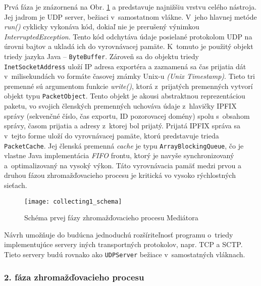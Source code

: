 Prvá fáza je znázornená na Obr. \ref{o:collecting1_schema} a predstavuje najnižšiu vrstvu celého 
nástroja. Jej jadrom je UDP server, bežiaci v~samostatnom vlákne. V~jeho hlavnej metóde \emph{run()}
cyklicky vykonáva kód, dokiaľ nie je prerušený výnimkou \emph{InterruptedException}.
Tento kód odchytáva údaje posielané protokolom UDP na úrovni bajtov a ukladá ich do 
vyrovnávacej pamäte. K~tomuto je použitý objekt triedy jazyka Java -- \verb|ByteBuffer|. Zároveň sa do 
objektu triedy \verb|InetSocketAddress| uloží IP adresa exportéra a zaznamená sa čas prijatia dát
v~milisekundách vo formáte časovej známky Unix-u \emph{(Unix Timestamp)}. Tieto tri premenné sú argumentom 
funkcie \emph{write()}, 
ktorá z~prijatých premenných vytvorí objekt typu \verb|PacketObject|. Tento objekt je akousi
abstraktnou reprezentáciou paketu, vo svojich členských premenných uchováva údaje z~hlavičky
IPFIX správy (sekvenčné číslo, čas exportu, ID pozorovacej domény) spolu s~obsahom správy, časom 
prijatia a adresy z~ktorej bol prijatý. Prijatá IPFIX správa sa v~tejto forme uloží do vyrovnávacej 
pamäte, ktorú predstavuje trieda \verb|PacketCache|. Jej členská 
premenná \emph{cache} je typu \verb|ArrayBlockingQueue|, čo je vlastne Java implementácia \emph{FIFO}
frontu, ktorý je navyše synchronizovaný a~optimalizovaný na vysoký výkon. Táto vyrovnávacia pamäť 
medzi prvou a druhou fázou zhromažďovacieho procesu je kritická vo vysoko rýchlostných sieťach. 

\begin{figure}[ht!]
\centering
\texttt{[image: collecting1\_schema]}
\caption{Schéma prvej fázy zhromažďovacieho procesu Mediátora}\label{o:collecting1_schema}
\end{figure}

Návrh umožňuje do budúcna jednoduchú rozšíriteľnosť programu o~triedy implementujúce servery iných transportných 
protokolov, napr. TCP a SCTP. Tieto servery budú rovnako ako \verb|UDPServer| bežiace v~samostatných 
vláknach.

\subsubsection{2. fáza zhromažďovacieho procesu}

